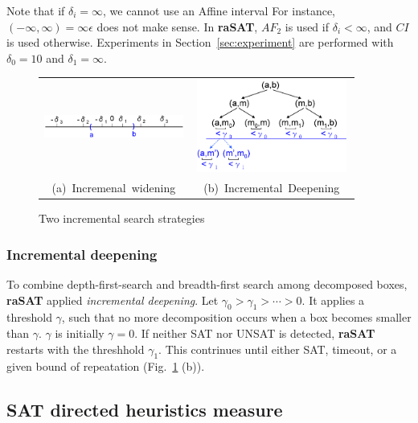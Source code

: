 \documentclass[runningheads,a4paper,oribibl]{llncs}
\begin{document}
Note that if $\delta_i = \infty$, we cannot use an Affine interval
For instance, $(-\infty,\infty) = \infty \epsilon$ does not make sense.
In {\bf raSAT}, $AF_2$ is used if $\delta_i < \infty$, and $CI$ is used otherwise. 
Experiments in Section~\ref{sec:experiment} are performed 
with $\delta_0 = 10$ and $\delta_1 = \infty$.
\begin{figure}[ht]
\begin{minipage}[b]{1.0\linewidth}
\centering
\begin{tabular}{c@{\qquad}c}
\includegraphics[height=0.4in,width=1.8in]{IncWiden.png} &
\includegraphics[height=1.2in,width=2in]{IncDeepen.png} \\
\mbox{(a) Incremenal widening} & \mbox{(b) Incremental Deepening} \\
\end{tabular}
\caption{Two incremental search strategies}
\label{fig:incwid}
\end{minipage}
\end{figure}


\subsubsection*{Incremental deepening}

To combine depth-first-search and breadth-first search among decomposed boxes,
{\bf raSAT} applied {\em incremental deepening}. 
Let $\gamma_0 > \gamma_1 > \cdots > 0$. 
It applies a threshold $\gamma$, such that no more decomposition occurs 
when a box becomes smaller than $\gamma$.
$\gamma$ is initially $\gamma=0$. 
If neither SAT nor UNSAT is detected, {\bf raSAT} restarts with the threshhold $\gamma_1$.
This contrinues until either SAT, timeout, or
a given bound of repeatation (Fig.~\ref{fig:incwid} (b)). 


\subsection{SAT directed heuristics measure} \label{sec:SATheuristics}
\end{document}
